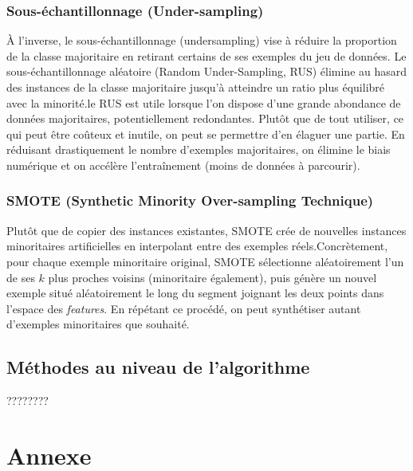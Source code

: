 \documentclass[a4paper,12pt]{article}
\begin{document}
\subsubsection{Sous-échantillonnage (Under-sampling)}

À l’inverse, le sous-échantillonnage (undersampling) vise à réduire la proportion de la classe
majoritaire en retirant certains de ses exemples du jeu de données. Le sous-échantillonnage aléatoire
(Random Under-Sampling, RUS) élimine au hasard des instances de la classe majoritaire jusqu’à atteindre
un ratio plus équilibré avec la minorité.le RUS est utile lorsque l’on dispose d’une grande abondance de
données majoritaires, potentiellement redondantes. Plutôt que de tout utiliser, ce qui peut être
coûteux et inutile, on peut se permettre d’en élaguer une partie. En réduisant drastiquement le nombre
d’exemples majoritaires, on élimine le biais numérique et on accélère l’entraînement (moins de
données à parcourir).

\subsubsection{SMOTE (Synthetic Minority Over-sampling Technique)}



Plutôt que de copier des instances existantes,
SMOTE crée de nouvelles instances minoritaires artificielles en interpolant entre des exemples réels.Concrètement, pour chaque exemple minoritaire original, SMOTE sélectionne aléatoirement l’un de ses
$k$ plus proches voisins (minoritaire également), puis génère un nouvel exemple situé aléatoirement le
long du segment joignant les deux points dans l’espace des \textit{features}. En répétant ce procédé, on
peut synthétiser autant d’exemples minoritaires que souhaité.



\subsection{Méthodes au niveau de l'algorithme }
????????





\newpage

\section*{Annexe}
\end{document}
